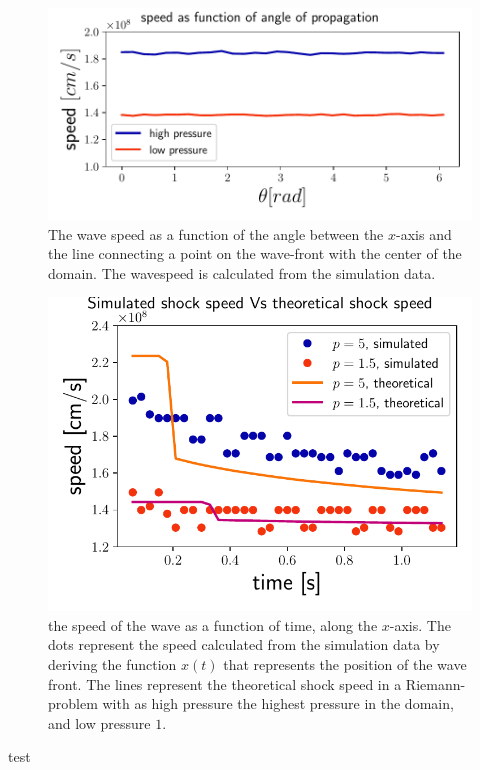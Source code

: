 \begin{figure}[h]
	\centering
	\includegraphics[width=\linewidth]{images/speed-angle-hd.pdf}
	\caption{The wave speed as a function of the angle between the $x$-axis and the line connecting a point on the wave-front with the center of the domain. The wavespeed is calculated from the simulation data.}
	\label{fig:speed-angle-hd}
\end{figure}

\begin{figure}[H]
	\centering
	\includegraphics[width=\linewidth]{images/speed-time-hd.pdf}
	\caption{the speed of the wave as a function of time, along the $x$-axis. The dots represent the speed calculated from the simulation data by deriving the function $x(t)$ that represents the position of the wave front. The lines represent the theoretical shock speed in a Riemann-problem with as high pressure the highest pressure in the domain, and low pressure $1$.}
	\label{fig:speed-time-hd}
\end{figure}


test
